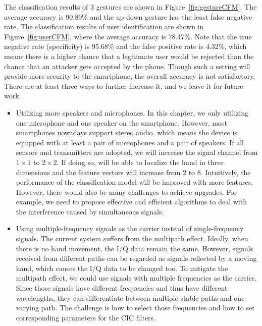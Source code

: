 The classification results of 3 gestures are shown in Figure~\ref{fig:gestureCFM}. The average accuracy is 90.89\% and the up-down gesture has the least false negative rate. The classification results of user identification are shown in Figure~\ref{fig:userCFM}, where the average accuracy is 78.47\%. Note that the true negative rate (specificity) is 95.68\% and the false positive rate is 4.32\%, which means there is a higher chance that a legitimate user would be rejected than the chance that an attacker gets accepted by the phone. Though such a setting will provide more security to the smartphone, the overall accuracy is not satisfactory. There are at least three ways to further increase it, and we leave it for future work:
\begin{itemize}
	\item Utilizing more speakers and microphones. In this chapter, we only utilizing one microphone and one speaker on the smartphone. However, most smartphones nowadays support stereo audio, which means the device is equipped with at least a pair of microphones and a pair of speakers. If all sensors and transmitters are adopted, we will increase the signal channel from $1\times1$ to $2 \times2$. If doing so, {\uu} will be able to localize the hand in three dimensions and the feature vectors will increase from 2 to 8. Intuitively, the performance of the classification model will be improved with more features. However, there would also be many challenges to achieve upgrades. For example, we need to propose effective and efficient algorithms to deal with the interference caused by simultaneous signals.
	
	\item Using multiple-frequency signals as the carrier instead of single-frequency signals. The current {\uu} system suffers from the multipath effect. Ideally, when there is no hand movement, the I/Q data remain the same. However, signals received from different paths can be regarded as signals reflected by a moving hand, which causes the I/Q data to be changed too. To mitigate the multipath effect, we could use signals with multiple frequencies as the carrier. Since those signals have different frequencies and thus have different wavelengths, they can differentiate between multiple stable paths and one varying path. The challenge is how to select those frequencies and how to set corresponding parameters for the CIC filters.
	

\end{itemize}
